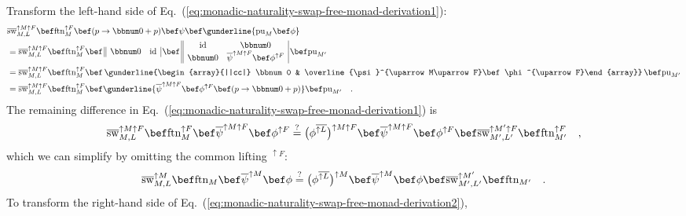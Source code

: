 Transform the left-hand side of Eq.~(\ref{eq:monadic-naturality-swap-free-monad-derivation1}):
\begin{align*}
 & \overline{\text{sw}}_{M,L}^{\uparrow M\uparrow F}\bef\text{ftn}_{M}^{\uparrow F}\bef(p\rightarrow\bbnum 0+p)\bef\psi\bef\gunderline{\text{pu}_{M}\bef\phi}\\
 & =\overline{\text{sw}}_{M,L}^{\uparrow M\uparrow F}\bef\text{ftn}_{M}^{\uparrow F}\bef\,\begin{array}{||cc|}
\bbnum 0 & \text{id}\end{array}\,\bef\,\begin{array}{||cc|}
\text{id} & \bbnum 0\\
\bbnum 0 & \overline{\psi}^{\uparrow M\uparrow F}\bef\phi^{\uparrow F}
\end{array}\,\bef\text{pu}_{M^{\prime}}\\
 & =\overline{\text{sw}}_{M,L}^{\uparrow M\uparrow F}\bef\text{ftn}_{M}^{\uparrow F}\bef\,\gunderline{\begin{array}{||cc|}
\bbnum 0 & \overline{\psi}^{\uparrow M\uparrow F}\bef\phi^{\uparrow F}\end{array}}\,\bef\text{pu}_{M^{\prime}}\\
 & =\overline{\text{sw}}_{M,L}^{\uparrow M\uparrow F}\bef\text{ftn}_{M}^{\uparrow F}\bef\gunderline{\overline{\psi}^{\uparrow M\uparrow F}\bef\phi^{\uparrow F}\bef(p\rightarrow\bbnum 0+p)}\bef\text{pu}_{M^{\prime}}\quad.
\end{align*}
The remaining difference in Eq.~(\ref{eq:monadic-naturality-swap-free-monad-derivation1})
is
\[
\overline{\text{sw}}_{M,L}^{\uparrow M\uparrow F}\bef\text{ftn}_{M}^{\uparrow F}\bef\overline{\psi}^{\uparrow M\uparrow F}\bef\phi^{\uparrow F}\overset{?}{=}\big(\phi^{\overline{\uparrow L}}\big)^{\uparrow M\uparrow F}\bef\overline{\psi}^{\uparrow M\uparrow F}\bef\phi^{\uparrow F}\bef\overline{\text{sw}}_{M^{\prime},L^{\prime}}^{\uparrow M^{\prime}\uparrow F}\bef\text{ftn}_{M^{\prime}}^{\uparrow F}\quad,
\]
which we can simplify by omitting the common lifting $^{\uparrow F}$:
\begin{equation}
\overline{\text{sw}}_{M,L}^{\uparrow M}\bef\text{ftn}_{M}\bef\overline{\psi}^{\uparrow M}\bef\phi\overset{?}{=}\big(\phi^{\overline{\uparrow L}}\big)^{\uparrow M}\bef\overline{\psi}^{\uparrow M}\bef\phi\bef\overline{\text{sw}}_{M^{\prime},L^{\prime}}^{\uparrow M^{\prime}}\bef\text{ftn}_{M^{\prime}}\quad.\label{eq:monadic-naturality-swap-free-monad-derivation2}
\end{equation}
To transform the right-hand side of Eq.~(\ref{eq:monadic-naturality-swap-free-monad-derivation2}),
